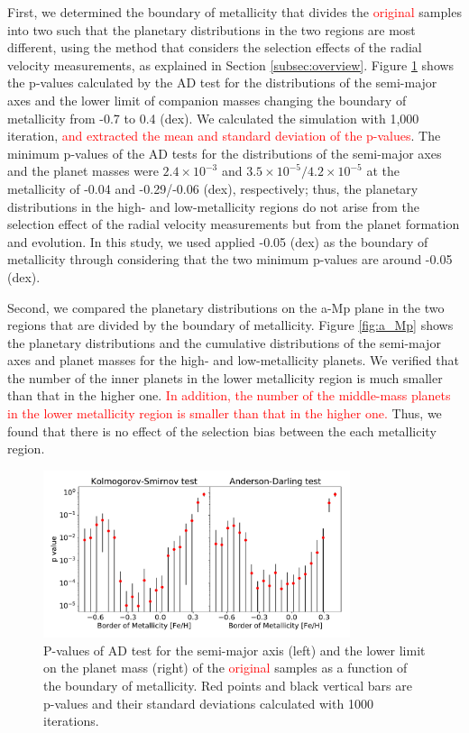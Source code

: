 \documentclass[twocolumn, dvipdfmx]{aastex62}
\def\red<#1>{\textcolor{red}{#1}}
\begin{document}
\begin{CJK*}{UTF8}{min}
First, we determined the boundary of metallicity that divides the \red<original> samples into two such that the planetary distributions in the two regions are most different, using the method that considers the selection effects of the radial velocity measurements, as explained in Section \ref{subsec:overview}. Figure \ref{fig:pvalue} shows the p-values calculated by the AD test for the distributions of the semi-major axes and the lower limit of companion masses changing the boundary of metallicity from -0.7 to 0.4 (dex). We calculated the simulation with 1,000 iteration, \red<and extracted the mean and standard deviation of the p-values>. The minimum p-values of the AD tests for the distributions of the semi-major axes and the planet masses were $2.4\times10^{-3}$ and $3.5\times10^{-5}/4.2\times10^{-5}$ at the metallicity of -0.04 and -0.29/-0.06 (dex), respectively; thus, the planetary distributions in the high- and low-metallicity regions do not arise from the selection effect of the radial velocity measurements but from the planet formation and evolution. In this study, we used applied -0.05 (dex) as the boundary of metallicity through considering that the two minimum p-values are around -0.05 (dex).

Second, we compared the planetary distributions on the a-Mp plane in the two regions that are divided by the boundary of metallicity. Figure \ref{fig:a_Mp} shows the planetary distributions and the cumulative distributions of the semi-major axes and planet masses for the high- and low-metallicity planets. We verified that the number of the inner planets in the lower metallicity region is much smaller than that in the higher one. \red<In addition, the number of the middle-mass planets in the lower metallicity region is smaller than that in the higher one.> Thus, we found that there is no effect of the selection bias between the each metallicity region.

\begin{figure}[t]
\begin{center}
\includegraphics[width=9cm]{../../../Figure/pvalues_plot.pdf}
\caption{P-values of AD test for the semi-major axis (left) and the lower limit on the planet mass (right) of the \red<original> samples as a function of the boundary of metallicity. Red points and black vertical bars are p-values and their standard deviations calculated with 1000 iterations. \label{fig:pvalue}}
\end{center}
\end{figure}


\end{CJK*}
\end{document}
